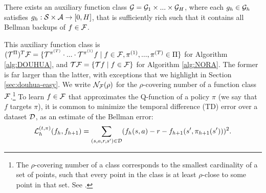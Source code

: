 \begin{aspt}
    There exists an auxiliary function class ${\mathcal{G}} = {\mathcal{G}}_1 \times ...\times{\mathcal{G}}_H$, where each $g_h \in {\mathcal{G}}_h$ satisfies $g_h: {\mathcal{S}} \times {\mathcal{A}} \to [0, H]$, that is sufficiently rich such that it contains all Bellman backups of $f \in {\mathcal{F}}$. 
\end{aspt}


This auxiliary function class is $({\mathcal{T}}^\Pi)^T {\mathcal{F}} = \{{\mathcal{T}}^{\pi^{(T)}} \cdot ... \cdot {\mathcal{T}}^{\pi^{(1)}} f \mid f \in {\mathcal{F}}, \pi^{(1)},...,\pi^{(T)} \in \Pi\}$ for Algorithm \ref{alg:DOUHUA}, and ${\mathcal{T}} {\mathcal{F}} = \{{\mathcal{T}} f \mid f \in {\mathcal{F}}\}$ for Algorithm \ref{alg:NORA}. The former is far larger than the latter, with exceptions that we highlight in Section \ref{sec:douhua-easy}. 
We write ${\mathcal{N}}_{\mathcal{F}}(\rho)$ for the $\rho$-covering number of a function class ${\mathcal{F}}$.\footnote{The $\rho$-covering number of a class corresponds to the smallest cardinality of a set of points, such that every point in the class is at least $\rho$-close to some point in that set. See \cite{wainwright2019high}.} To learn $f \in {\mathcal{F}}$ that approximates the Q-function of a policy $\pi$ (we say that $f$ targets $\pi$), it is common to minimize the temporal difference (TD) error over a dataset ${\mathcal{D}}$, as an estimate of the Bellman error:
\begin{align}\label{eqn:TD-error}
    {\mathcal{L}}_h^{(t,\pi)}(f_h,f_{h+1})  = \sum_{(s,a,r,s') \in {\mathcal{D}}} (f_h(s,a) - r - f_{h+1}(s',\pi_{h+1}(s')))^2.
\end{align} 

